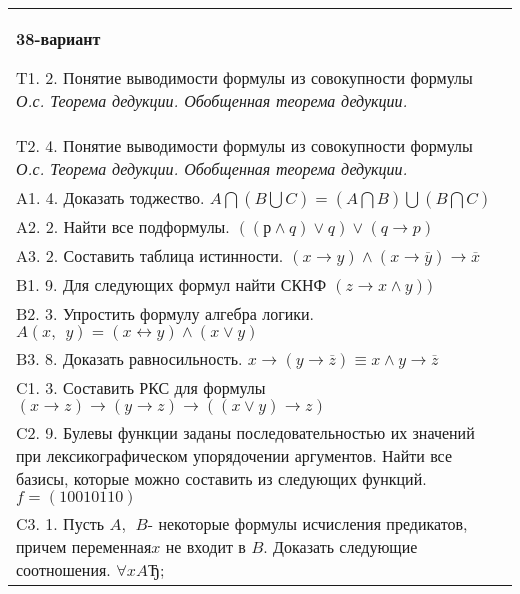 \documentclass{article}
\begin{document}
\begin{tabular}{m{17cm}}
\textbf{38-вариант}
\newline

T1. 2. Понятие выводимости формулы из совокупности формулы \emph{О.с. Теорема дедукции. Обобщенная теорема дедукции.} \\
T2. 4. Понятие выводимости формулы из совокупности формулы \emph{О.с. Теорема дедукции. Обобщенная теорема дедукции.} \\
A1. 4. Доказать тоджество. \(A\bigcap(B\bigcup C) = (A\bigcap B)\bigcup(B\bigcap C)\) \\
A2. 2. Найти все подформулы. \(\left( (р \land q) \vee q \right) \vee (q \rightarrow p)\) \\
A3. 2. Составить таблица истинности. \((x \rightarrow y) \land (x \rightarrow \overline{y}) \rightarrow \overline{x}\) \\
B1. 9. Для следующих формул найти СКНФ \((z \rightarrow x \land y))\) \\
B2. 3. Упростить формулу алгебра логики. \(A(x,\ \ y) = (x \leftrightarrow y) \land (x \vee y)\) \\
B3. 8. Доказать равносильность. \(x \rightarrow \left( y \rightarrow \overline{z} \right) \equiv x \land y \rightarrow \overline{z}\) \\
C1. 3. Составить РКС для формулы \((x \rightarrow z) \rightarrow (y \rightarrow z) \rightarrow ((x \vee y) \rightarrow z)\) \\
C2. 9. Булевы функции заданы последовательностью их значений при лексикографическом упорядочении аргументов. Найти все базисы, которые можно составить из следующих функций. \(f = (10010110)\) \\
C3. 1. Пусть \(A,\ \ B\)- некоторые формулы исчисления предикатов, причем переменная\(x\) не входит в \(B\). Доказать следующие соотношения. \(\forall xAЂ\); \\

\end{tabular}
\vspace{1cm}
\end{document}
